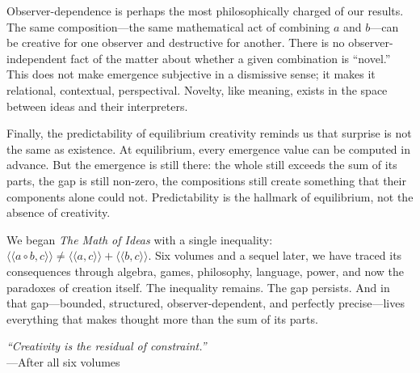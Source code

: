 \documentclass[11pt,oneside]{book}
\theoremstyle{definition}
\theoremstyle{plain}
\theoremstyle{remark}
\newcommand{\compose}{\circ}                 %
\newcommand{\rs}[2]{\langle\!\langle #1, #2 \rangle\!\rangle}  %
\begin{document}
Observer-dependence is perhaps the most philosophically charged of our results.
The same composition---the same mathematical act of combining $a$ and $b$---can
be creative for one observer and destructive for another. There is no
observer-independent fact of the matter about whether a given combination is
``novel.'' This does not make emergence subjective in a dismissive sense; it
makes it relational, contextual, perspectival. Novelty, like meaning, exists
in the space between ideas and their interpreters.

Finally, the predictability of equilibrium creativity reminds us that surprise
is not the same as existence. At equilibrium, every emergence value can be
computed in advance. But the emergence is still there: the whole still exceeds
the sum of its parts, the gap is still non-zero, the compositions still
create something that their components alone could not. Predictability is the
hallmark of equilibrium, not the absence of creativity.

We began \emph{The Math of Ideas} with a single inequality:
$\rs{a \compose b}{c} \neq \rs{a}{c} + \rs{b}{c}$. Six volumes and a sequel
later, we have traced its consequences through algebra, games, philosophy,
language, power, and now the paradoxes of creation itself. The inequality
remains. The gap persists. And in that gap---bounded, structured, observer-dependent,
and perfectly precise---lives everything that makes thought more than
the sum of its parts.

\vspace{2em}
\begin{flushright}
\textit{``Creativity is the residual of constraint.''}\\
---After all six volumes
\end{flushright}
\end{document}
